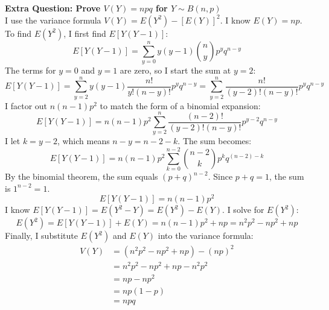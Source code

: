 \documentclass[12pt]{article}
\begin{document}
\textbf{Extra Question: Prove $V(Y) = npq$ for $Y \sim B(n,p)$} \\
I use the variance formula $V(Y) = E(Y^2) - [E(Y)]^2$. I know $E(Y) = np$.
To find $E(Y^2)$, I first find $E[Y(Y-1)]$:
\[ E[Y(Y-1)] = \sum_{y=0}^{n} y(y-1) \binom{n}{y} p^y q^{n-y} \]
The terms for $y=0$ and $y=1$ are zero, so I start the sum at $y=2$:
\[ E[Y(Y-1)] = \sum_{y=2}^{n} y(y-1) \frac{n!}{y!(n-y)!} p^y q^{n-y} = \sum_{y=2}^{n} \frac{n!}{(y-2)!(n-y)!} p^y q^{n-y} \]
I factor out $n(n-1)p^2$ to match the form of a binomial expansion:
\[ E[Y(Y-1)] = n(n-1)p^2 \sum_{y=2}^{n} \frac{(n-2)!}{(y-2)!(n-y)!} p^{y-2} q^{n-y} \]
I let $k = y-2$, which means $n-y = n-2-k$. The sum becomes:
\[ E[Y(Y-1)] = n(n-1)p^2 \sum_{k=0}^{n-2} \binom{n-2}{k} p^k q^{(n-2)-k} \]
By the binomial theorem, the sum equals $(p+q)^{n-2}$. Since $p+q=1$, the sum is $1^{n-2} = 1$.
\[ E[Y(Y-1)] = n(n-1)p^2 \]
I know $E[Y(Y-1)] = E(Y^2 - Y) = E(Y^2) - E(Y)$. I solve for $E(Y^2)$:
\[ E(Y^2) = E[Y(Y-1)] + E(Y) = n(n-1)p^2 + np = n^2p^2 - np^2 + np \]
Finally, I substitute $E(Y^2)$ and $E(Y)$ into the variance formula:
\begin{align*}
V(Y) &= (n^2p^2 - np^2 + np) - (np)^2 \\
&= n^2p^2 - np^2 + np - n^2p^2 \\
&= np - np^2 \\
&= np(1-p) \\
&= npq
\end{align*}
\end{document}
